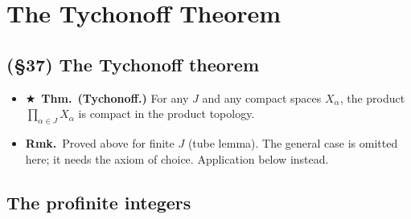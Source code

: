 \documentclass[12pt,a4paper]{article}
\newcommand{\Thm}{\textbf{Thm.}~}
\newcommand{\Rmk}{\textbf{Rmk.}~}
\newcommand{\Key}{$\bigstar$~}                  %
\newenvironment{BL}%
  {\begin{itemize}[leftmargin=1.4em,labelsep=0.55em,itemsep=11pt,topsep=11pt,parsep=0pt]}%
  {\end{itemize}}
\begin{document}
\section{The Tychonoff Theorem}

\subsection{(\S37) The Tychonoff theorem}

\begin{BL}
\item \Key\Thm \textbf{(Tychonoff.)} For any $J$ and any compact spaces $X_\alpha$,
      the product $\prod_{\alpha\in J}X_\alpha$ is compact in the product topology.
\item \Rmk Proved above for finite $J$ (tube lemma). The general case is omitted here;
      it needs the axiom of choice. Application below instead.
\end{BL}

\subsection{The profinite integers}
\end{document}
